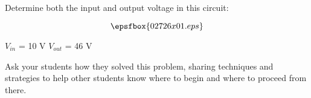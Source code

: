 

Determine both the input and output voltage in this circuit:

$$\epsfbox{02726x01.eps}$$







$V_{in}$ = 10 V \hskip 30pt $V_{out}$ = 46 V







Ask your students how they solved this problem, sharing techniques and strategies to help other students know where to begin and where to proceed from there.




